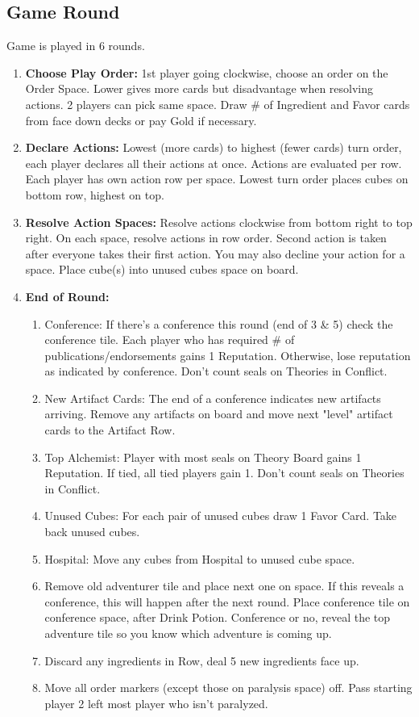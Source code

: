 \documentclass[12pt]{article}
\newenvironment{enumerateCustom}
{\begin{enumerate}
  \setlength{\itemsep}{1pt}
  \setlength{\parskip}{0pt}
  \setlength{\parsep}{0pt}}
{\end{enumerate}}
\begin{document}
\begin{multicols*}{2}
\section*{Game Round}
Game is played in 6 rounds.
\begin{enumerateCustom}
    \item \textbf{Choose Play Order:} 1st player going clockwise, choose an order on the Order Space. Lower gives more cards but disadvantage when resolving actions. 2 players can pick same space. Draw \# of Ingredient and Favor cards from face down decks or pay Gold if necessary.
    \item \textbf{Declare Actions:} Lowest (more cards) to highest (fewer cards) turn order, each player declares all their actions at once. Actions are evaluated per row. Each player has own action row per space. Lowest turn order places cubes on bottom row, highest on top.
    \item \textbf{Resolve Action Spaces:} Resolve actions clockwise from bottom right to top right. On each space, resolve actions in row order. Second action is taken after everyone takes their first action. You may also decline your action for a space. Place cube(s) into unused cubes space on board.
    \item \textbf{End of Round:} 
        \begin{enumerateCustom}
            \item Conference: If there's a conference this round (end of 3 \& 5) check the conference tile. Each player who has required \# of publications/endorsements gains 1 Reputation. Otherwise, lose reputation as indicated by conference. Don't count seals on Theories in Conflict.
            \item New Artifact Cards: The end of a conference indicates new artifacts arriving. Remove any artifacts on board and move next "level" artifact cards to the Artifact Row.
            \item Top Alchemist: Player with most seals on Theory Board gains 1 Reputation. If tied, all tied players gain 1. Don't count seals on Theories in Conflict.
            \item Unused Cubes: For each pair of unused cubes draw 1 Favor Card. Take back unused cubes.
            \item Hospital: Move any cubes from Hospital to unused cube space.
            \item Remove old adventurer tile and place next one on space. If this reveals a conference, this will happen after the next round. Place conference tile on conference space, after Drink Potion. Conference or no, reveal the top adventure tile so you know which adventure is coming up.
            \item Discard any ingredients in Row, deal 5 new ingredients face up.
            \item Move all order markers (except those on paralysis space) off. Pass starting player 2 left most player who isn't paralyzed.
        \end{enumerateCustom}
\end{enumerateCustom}


\end{multicols*}
\end{document}
